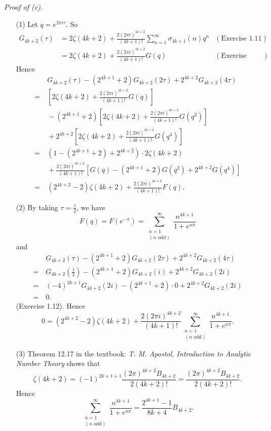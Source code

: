 \documentclass{article}
\begin{document}
\emph{Proof of (c).}
\begin{enumerate}
\item[(1)]
  Let $q = e^{2 \pi i \tau}$.
  So
  \begin{align*}
    G_{4k+2}(\tau)
    &=
    2 \zeta(4k+2)
      + \frac{2(2\pi i)^{4k+2}}{(4k+1)!} \sum_{n=1}^{\infty} \sigma_{4k+1}(n) q^n
      &(\text{Exercise 1.11}) \\
    &=
    2 \zeta(4k+2)
      + \frac{2(2\pi i)^{4k+2}}{(4k+1)!} G(q)
      &(\text{Exercise 1.14(c)})
  \end{align*}
  Hence
  \begin{align*}
    & \:
    G_{4k+2}(\tau) - (2^{4k+1} + 2) G_{4k+2}(2\tau) + 2^{4k+2} G_{4k+2}(4\tau) \\
    = &\:
      \left[ 2 \zeta(4k+2)
        + \frac{2(2\pi i)^{4k+2}}{(4k+1)!} G(q) \right] \\
    &\:
      - (2^{4k+1} + 2) \left[ 2 \zeta(4k+2)
        + \frac{2(2\pi i)^{4k+2}}{(4k+1)!} G(q^2) \right] \\
    &\:
      + 2^{4k+2} \left[ 2 \zeta(4k+2)
        + \frac{2(2\pi i)^{4k+2}}{(4k+1)!} G(q^4) \right] \\
    = &\:
    (1 - (2^{4k+1} + 2) + 2^{4k+2}) \cdot 2\zeta(4k+2) \\
    &\:
      + \frac{2(2\pi i)^{4k+2}}{(4k+1)!}
        [G(q) - (2^{4k+1} + 2)G(q^2) + 2^{4k+2}G(q^4)] \\
    = &\:
    (2^{4k+2} - 2) \zeta(4k+2)
      + \frac{2(2\pi i)^{4k+2}}{(4k+1)!} F(q).
  \end{align*}

\item[(2)]
  By taking $\tau = \frac{i}{2}$, we have
  \[
    F(q)
    = F(e^{-\pi})
    = \sum_{\substack{n=1 \\ (\text{$n$ odd})}}^{\infty} \frac{n^{4k+1}}{1+e^{n\pi}}
  \]
  and
  \begin{align*}
    & \:
    G_{4k+2}(\tau) - (2^{4k+1} + 2) G_{4k+2}(2\tau) + 2^{4k+2} G_{4k+2}(4\tau) \\
    = &\:
    G_{4k+2}\left( \frac{i}{2} \right)
      - (2^{4k+1} + 2) G_{4k+2}(i)
      + 2^{4k+2} G_{4k+2}(2i) \\
    = &\:
    (-4)^{2k+1} G_{4k+2}(2i) - (2^{4k+1} + 2) \cdot 0 + 2^{4k+2} G_{4k+2}(2i) \\
    = &\:
    0.
  \end{align*}
  (Exercise 1.12).
  Hence
  \[
    0 = (2^{4k+2} - 2) \zeta(4k+2)
    + \frac{2(2\pi i)^{4k+2}}{(4k+1)!}
    \sum_{\substack{n=1 \\ (\text{$n$ odd})}}^{\infty} \frac{n^{4k+1}}{1+e^{n\pi}}.
  \]

\item[(3)]
  Theorem 12.17 in the textbook: \emph{T. M. Apostol, Introduction to Analytic Number Theory}
  shows that
  \[
    \zeta(4k+2)
    = (-1)^{2k+1+1} \frac{(2\pi)^{4k+2} B_{4k+2}}{2(4k+2)!}
    = \frac{(2\pi)^{4k+2} B_{4k+2}}{2(4k+2)!}.
  \]
  Hence
  \[
    \sum_{\substack{n=1 \\ (\text{$n$ odd})}}^{\infty} \frac{n^{4k+1}}{1+e^{n\pi}}
    = \frac{2^{4k+1}-1}{8k+4}B_{4k+2}.
  \]
\end{enumerate}
\end{document}
